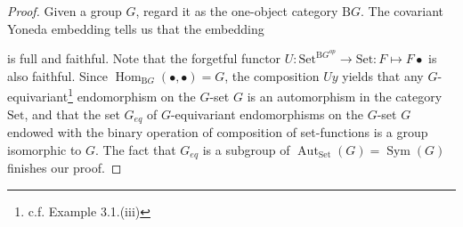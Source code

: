 \documentclass{article}
\theoremstyle{definition}
\theoremstyle{definition}
\theoremstyle{remark}
\DeclareMathOperator{\Hom}{Hom}
\DeclareMathOperator{\Aut}{Aut}
\DeclareMathOperator{\Sym}{Sym}
\begin{document}
	\begin{proof}
		Given a group $G$, regard it as the one-object category $\mathrm{B}G$. The covariant Yoneda embedding tells us that the embedding
		\begin{center}
	\end{center}
	is full and faithful. Note that the forgetful functor $U:\mathrm{Set}^{\mathrm{B}G^{op}}\to \mathrm{Set}:F\mapsto F\bullet$ is also faithful. Since $\Hom_{\mathrm{B}G}(\bullet,\bullet)=G$, the composition $Uy$ yields that any $G$-equivariant\footnote{c.f. Example 3.1.(iii)} endomorphism on the $G$-set $G$ is an automorphism in the category $\mathrm{Set}$, and that the set $G_{eq}$ of $G$-equivariant endomorphisms on the $G$-set $G$ endowed with the binary operation of composition of set-functions is a group isomorphic to $G$. The fact that $G_{eq}$ is a subgroup of $\Aut_\mathrm{Set}(G)=\Sym(G)$ finishes our proof.
	\end{proof}
\newpage
\end{document}
